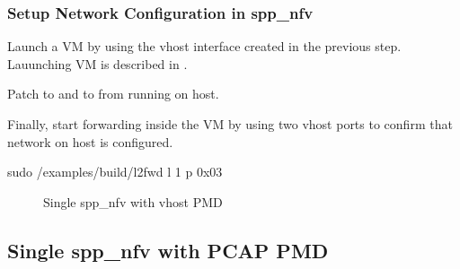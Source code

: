 \documentclass[a4paper,11pt,openany,oneside,english]{sphinxmanual}
\begin{document}
\subsubsection{Setup Network Configuration in spp\_nfv}
\label{\detokenize{usecases/spp_nfv:setup-network-configuration-in-spp-nfv}}\label{\detokenize{usecases/spp_nfv:usecase-spp-nfv-l2fwd-vhost-nw}}
Launch a VM by using the vhost interface created in the previous step.
Lauunching VM is described in
{\hyperref[\detokenize{gsg/howto_use:spp-gsg-howto-use}]{}}.

Patch  to  and  to  from 
running on host.

\begin{sphinxVerbatim}[commandchars=\\\{\},formatcom=\footnotesize]
\end{sphinxVerbatim}

Finally, start forwarding inside the VM by using two vhost ports
to confirm that network on host is configured.

\begin{sphinxVerbatim}[commandchars=\\\{\},formatcom=\footnotesize]
 sudo /examples/build/l2fwd \PYGZhy{}l \PYGZhy{}1 \PYGZhy{}\PYGZhy{} \PYGZhy{}p 0x03
\end{sphinxVerbatim}

\begin{figure}[htbp]
\centering
\capstart

\noindent{}
\caption{Single spp\_nfv with vhost PMD}\label{\detokenize{usecases/spp_nfv:id6}}\label{\detokenize{usecases/spp_nfv:figure-spp-nfv-l2fwd-vhost}}\end{figure}


\subsection{Single spp\_nfv with PCAP PMD}
\label{\detokenize{usecases/spp_nfv:single-spp-nfv-with-pcap-pmd}}
\end{document}
